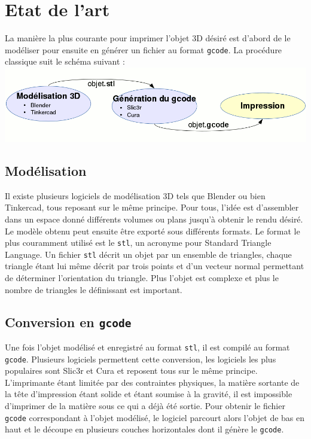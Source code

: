 \documentclass[11pt, titlepage]{article}
\begin{document}
\newpage
\section{Etat de l'art}
La manière la plus courante pour imprimer l'objet 3D désiré est d'abord de le modéliser pour ensuite en générer un fichier au format \verb&gcode&.
La procédure classique suit le schéma suivant :
\includegraphics[scale=1]{img/EtatDeLart.png}
\subsection{Modélisation}
Il existe plusieurs logiciels de modélisation 3D tels que Blender ou bien Tinkercad, tous reposant sur le même principe. Pour tous, l'idée est d'assembler dans un espace donné différents volumes ou plans jusqu'à obtenir le rendu désiré. Le modèle obtenu peut ensuite être exporté sous différents formats. Le format le plus couramment utilisé est le \verb&stl&, un acronyme pour Standard Triangle Language. Un fichier \verb&stl& décrit un objet par un ensemble de triangles, chaque triangle étant lui même décrit par trois points et d'un vecteur normal permettant de déterminer l'orientation du triangle. Plus l'objet est complexe et plus le nombre de triangles le définissant est important.

\subsection{Conversion en \verb&gcode&}
Une fois l'objet modélisé et enregistré au format \verb&stl&, il est compilé au format \verb&gcode&.
Plusieurs logiciels permettent cette conversion, les logiciels les plus populaires sont Slic3r et Cura et reposent tous sur le même principe.
L'imprimante étant limitée par des contraintes physiques, la matière sortante de la tête d'impression étant solide et étant soumise à la gravité, il est impossible d'imprimer de la matière sous ce qui a déjà été sortie.
Pour obtenir le fichier \verb&gcode& correspondant à l'objet modélisé, le logiciel parcourt alors l'objet de bas en haut et le découpe en plusieurs couches horizontales dont il génère le \verb&gcode&.
\end{document}
